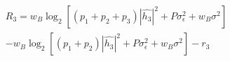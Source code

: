 \documentclass[preview]{standalone}
\begin{document}
\begin{align*}
R_3 = w_B \log_2 \left[(p_1 + p_2 + p_3) \left|\hat{h_3}\right|^2 + P \sigma_{\epsilon}^2 + w_B \sigma^2\right] \\ - w_B \log_2 \left[(p_1 + p_2) \left|\hat{h_3}\right|^2 + P \sigma_{\epsilon}^2 + w_B \sigma^2\right] - r_3
\end{align*}
\end{document}
